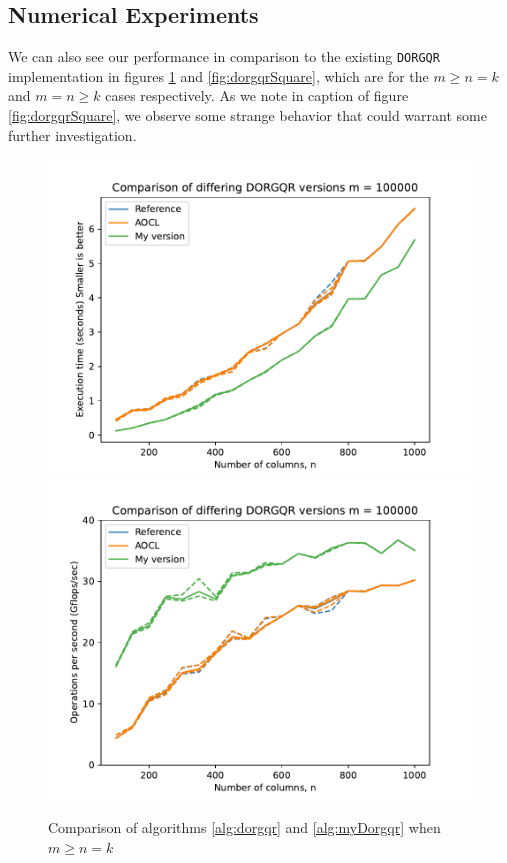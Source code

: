 \documentclass[12pt]{article}
\begin{document}
    \subsection{Numerical Experiments}
    We can also see our performance in comparison to the existing \verb|DORGQR| implementation in figures 
    \ref{fig:dorgqr} and \ref{fig:dorgqrSquare}, which are for the $m\geq n=k$ and $m=n\geq k$ cases respectively.
    As we note in caption of figure \ref{fig:dorgqrSquare}, we observe some strange behavior that could warrant
    some further investigation.
    \begin{figure}
        \centering
            \includegraphics[width=.45\textwidth]{figures/timeDORGQR.pdf}
            \includegraphics[width=.45\textwidth]{figures/flopDORGQR.pdf}
        \caption{Comparison of algorithms \ref{alg:dorgqr} and \ref{alg:myDorgqr} when $m\geq n=k$}\label{fig:dorgqr}
    \end{figure}
\end{document}
